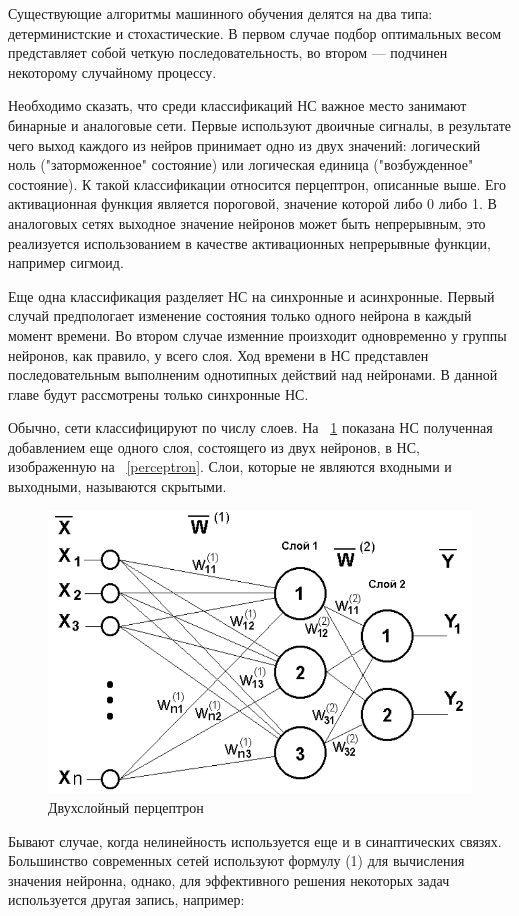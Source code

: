 \documentclass[a4paper,english,russian]{G2-105}
\begin{document}
\par Существующие алгоритмы машинного обучения делятся на два типа: детерминистские и стохастические. В первом случае подбор оптимальных весом представляет собой четкую последовательность, во втором --- подчинен некоторому случайному процессу. 
\par Необходимо сказать, что среди классификаций НС важное место занимают бинарные и аналоговые сети. Первые используют двоичные сигналы, в результате чего выход каждого из нейров принимает одно из двух значений: логический ноль ("заторможенное" состояние) или логическая единица ("возбужденное" состояние). К такой классификации относится перцептрон, описанные выше. Его активационная функция является пороговой, значение которой либо 0 либо 1. В аналоговых сетях выходное значение нейронов может быть непрерывным, это реализуется использованием в качестве активационных непрерывные функции, например сигмоид. 
\par Еще одна классификация разделяет НС на синхронные и асинхронные. Первый случай предпологает изменение состояния только одного нейрона в каждый момент времени. Во втором случае изменние произходит одновременно у группы нейронов, как правило, у всего слоя. Ход времени в НС представлен последовательным выполненим однотипных действий над нейронами. В данной главе будут рассмотрены только синхронные НС.
\par Обычно, сети классифицируют по числу слоев. На ~\ref{perceptron2} показана НС полученная добавлением еще одного слоя, состоящего из двух нейронов, в НС, изображенную на ~\ref{perceptron}. Слои, которые не являются входными и выходными, называются скрытыми. 
\begin{figure}
\begin{center}
    \includegraphics[width=0.6\linewidth]{perceptron2.png}
    \caption{Двухслойный перцептрон}
	\label{perceptron2}
\end{center}
\end{figure} 
\par Бывают случае, когда нелинейность используется еще и в синаптических связях. Большинство современных сетей используют формулу (1) для вычисления значения нейронна, однако, для эффективного решения некоторых задач используется другая запись, например:
\end{document}
